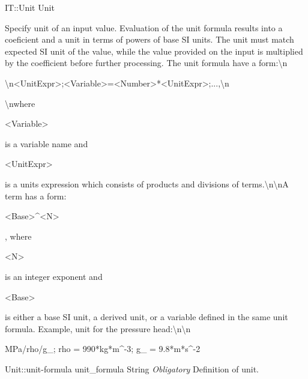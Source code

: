 \begin{RecordType}
	{IT::Unit}
	{Unit}
	{}%
	{}%
	{{{Specify unit of an input value.
Evaluation of the unit formula results into a coeficient and a unit in terms of powers of base SI units.
The unit must match expected SI unit of the value, while the value provided on the input is multiplied by the coefficient before further processing.
The unit formula have a form:{\textbackslash}n}\begin{ttfamily}{\textbackslash}n{\textless}UnitExpr{\textgreater};{\textless}Variable{\textgreater}={\textless}Number{\textgreater}*{\textless}UnitExpr{\textgreater};...,{\textbackslash}n\end{ttfamily}{{\textbackslash}nwhere }\begin{ttfamily}{\textless}Variable{\textgreater}\end{ttfamily}{ is a variable name and }\begin{ttfamily}{\textless}UnitExpr{\textgreater}\end{ttfamily}{ is a units expression which consists of products and divisions of terms.{\textbackslash}n{\textbackslash}nA term has a form: }\begin{ttfamily}{\textless}Base{\textgreater}{\^{}}{\textless}N{\textgreater}\end{ttfamily}{, where }\begin{ttfamily}{\textless}N{\textgreater}\end{ttfamily}{ is an integer exponent and }\begin{ttfamily}{\textless}Base{\textgreater}\end{ttfamily}{ is either a base SI unit, a derived unit, or a variable defined in the same unit formula.
Example, unit for the pressure head:{\textbackslash}n{\textbackslash}n}\begin{ttfamily}MPa/rho/g{\_}; rho = 990*kg*m{\^{}}-3; g{\_} = 9.8*m*s{\^{}}-2\end{ttfamily}%
}}
		\RecKey
			{Unit::unit-formula}
			{unit{\_}formula}
			{{String}}{}
			{ \it{Obligatory}}
			{{{Definition of unit.}%
}}
\end{RecordType}
